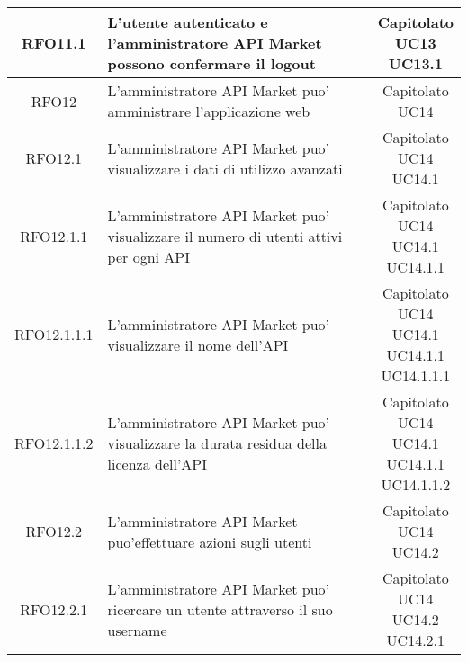 \begin{longtable}{|c|p{8cm}|c|}
RFO11.1 &  L'utente autenticato e l'amministratore API Market possono confermare il logout & \makecell*{Capitolato\\UC13\\UC13.1} \\
\hline

RFO12 &  L'amministratore API Market puo' amministrare l'applicazione web & \makecell*{Capitolato\\UC14} \\
\hline

RFO12.1 &  L'amministratore API Market puo' visualizzare i dati di utilizzo avanzati & \makecell*{Capitolato\\UC14\\UC14.1} \\
\hline

RFO12.1.1 &  L'amministratore API Market puo' visualizzare il numero di utenti attivi per ogni API & \makecell*{Capitolato\\UC14\\UC14.1\\UC14.1.1} \\
\hline

RFO12.1.1.1 &  L'amministratore API Market puo' visualizzare il nome dell'API & \makecell*{Capitolato\\UC14\\UC14.1\\UC14.1.1\\UC14.1.1.1} \\
\hline

RFO12.1.1.2 &  L'amministratore API Market puo' visualizzare la durata residua della licenza dell'API & \makecell*{Capitolato\\UC14\\UC14.1\\UC14.1.1\\UC14.1.1.2} \\
\hline

RFO12.2 &  L'amministratore API Market puo'effettuare azioni sugli utenti& \makecell*{Capitolato\\UC14\\UC14.2} \\
\hline

RFO12.2.1 &  L'amministratore API Market puo' ricercare un utente attraverso il suo username& \makecell*{Capitolato\\UC14\\UC14.2\\UC14.2.1} \\
\hline


\end{longtable}
